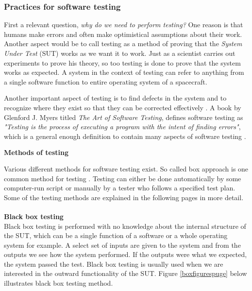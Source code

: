 \documentclass[english,12pt,a4paper,pdftex,elec,utf8]{aaltothesis}
\begin{document}
\subsubsection{Practices for software testing}
First a relevant question, \textit{why do we need to perform testing?} One reason is that humans make errors and often make optimistical assumptions about their work. Another aspect would be to call testing as a method of proving that the \textit{System Under Test} (SUT) works as we want it to work. Just as  a scientist carries out experiments to prove his theory, so too testing is done to prove that the system works as expected. A system in the context of testing can refer to anything from a single software function to entire operating system of a spacecraft. \cite{testingcomplex}\par
Another important aspect of testing is to find defects in the system and to recognize where they exist so that they can be corrected effectively \cite{sularikurssi, artofsofttesting}. A book by Glenford J. Myers titled \textit{The Art of Software Testing}, defines software testing as \textit{"Testing is the process of executing a program with the intent of finding errors"}, which is a general enough definition to contain many aspects of software testing \cite{artofsofttesting}.
\begin{center}
\textbf{Methods of testing}
\end{center}
Various different methods for software testing exist. So called box approach is one common method for testing \cite{sularikurssi, artofsofttesting}. Testing can either be done automatically by some computer-run script or manually by a tester who follows a specified test plan. 
Some of the testing methods are explained in the following pages in more detail.\\
\\
\textbf{Black box testing}\\ 
Black box testing is performed with no knowledge about the internal structure of the SUT, which can be a single function of a software or a whole operating system for example. A select set of inputs are given to the system and from the outputs we see how the system performed. If the outputs were what we expected, the system passed the test. Black box testing is usually used when we are interested in the outward functionality of the SUT. Figure \ref{boxfigurespuge} below illustrates black box testing method. \cite{artofsofttesting}\\ 
\end{document}
